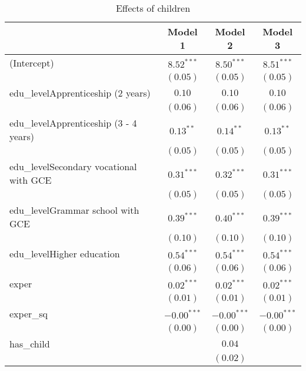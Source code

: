 
\begin{table}
\caption{Effects of children}
\begin{center}
\begin{tabular}{l c c c}
\hline
 & Model 1 & Model 2 & Model 3 \\
\hline
(Intercept)                             & $8.52^{***}$  & $8.50^{***}$  & $8.51^{***}$  \\
                                        & $(0.05)$      & $(0.05)$      & $(0.05)$      \\
edu\_levelApprenticeship (2 years)      & $0.10$        & $0.10$        & $0.10$        \\
                                        & $(0.06)$      & $(0.06)$      & $(0.06)$      \\
edu\_levelApprenticeship (3 - 4 years)  & $0.13^{**}$   & $0.14^{**}$   & $0.13^{**}$   \\
                                        & $(0.05)$      & $(0.05)$      & $(0.05)$      \\
edu\_levelSecondary vocational with GCE & $0.31^{***}$  & $0.32^{***}$  & $0.31^{***}$  \\
                                        & $(0.05)$      & $(0.05)$      & $(0.05)$      \\
edu\_levelGrammar school with GCE       & $0.39^{***}$  & $0.40^{***}$  & $0.39^{***}$  \\
                                        & $(0.10)$      & $(0.10)$      & $(0.10)$      \\
edu\_levelHigher education              & $0.54^{***}$  & $0.54^{***}$  & $0.54^{***}$  \\
                                        & $(0.06)$      & $(0.06)$      & $(0.06)$      \\
exper                                   & $0.02^{***}$  & $0.02^{***}$  & $0.02^{***}$  \\
                                        & $(0.01)$      & $(0.01)$      & $(0.01)$      \\
exper\_sq                               & $-0.00^{***}$ & $-0.00^{***}$ & $-0.00^{***}$ \\
                                        & $(0.00)$      & $(0.00)$      & $(0.00)$      \\
has\_child                              &               & $0.04$        &               \\
                                        &               & $(0.02)$      &               \\

\end{tabular}
\end{center}
\end{table}

